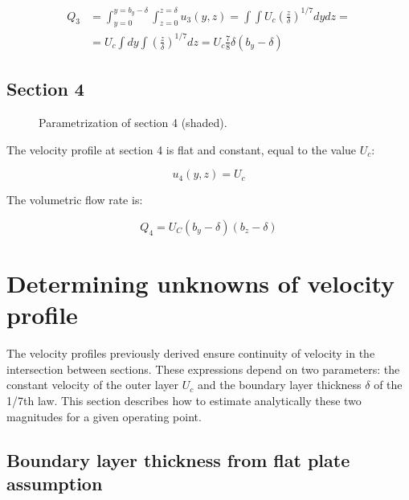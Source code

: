 \begin{equation}
\begin{split}
Q_3 &= \int_{y=0}^{y= b_y - \delta} \int_{z=0}^{z=\delta} u_3 \left( y, z  \right) = \int \int U_c \left( \frac{z}{\delta} \right)^{1/7} dy dz = \\
&= U_c  \int  dy \int \left( \frac{z}{\delta} \right)^{1/7} dz = U_c \frac{7}{8} \delta \left( b_y - \delta \right)
\end{split}
\end{equation}


\subsection*{Section 4}

\begin{figure}[h!]	
	\centering
	\caption{Parametrization of section 4 (shaded).}
	\label{fig:param_S4}
\end{figure}

The velocity profile at section 4 is flat and constant, equal to the value $U_c$:

\begin{equation}
\label{eq:3DBL_profile_u4}
\boxed{
u_4 \left( y, z \right) = U_c 
}
\end{equation}

The volumetric flow rate is:

\begin{equation}
\label{eq:3DBL_Q4}
\boxed{
Q_4 = U_C \left( b_y - \delta \right)  \left( b_z - \delta \right)
}
\end{equation}

\section*{Determining unknowns of velocity profile}

The velocity profiles previously derived ensure continuity of velocity in the intersection between sections. These expressions depend on two parameters: the constant velocity of the outer layer $U_c$ and the boundary layer thickness $\delta$ of the 1/7th law. This section describes how to estimate analytically these two magnitudes for a given operating point.


\subsection*{Boundary layer thickness from flat plate assumption}

